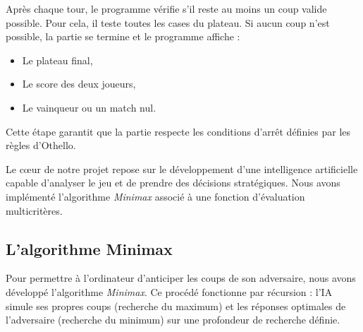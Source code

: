 \documentclass{article}
\begin{document}
Après chaque tour, le programme vérifie s'il reste au moins un coup valide possible. Pour cela, il teste toutes les cases du plateau. Si aucun coup n'est possible, la partie se termine et le programme affiche :

\begin{itemize}
    \item Le plateau final,
    \item Le score des deux joueurs,
    \item Le vainqueur ou un match nul.
\end{itemize}

Cette étape garantit que la partie respecte les conditions d'arrêt définies par les règles d'Othello.

Le cœur de notre projet repose sur le développement d'une intelligence artificielle capable d'analyser le jeu et de prendre des décisions stratégiques. Nous avons implémenté l'algorithme \emph{Minimax} associé à une fonction d'évaluation multicritères.

\subsection{L'algorithme Minimax}

Pour permettre à l'ordinateur d'anticiper les coups de son adversaire, nous avons développé l'algorithme \emph{Minimax}. Ce procédé fonctionne par récursion : l'IA simule ses propres coups (recherche du maximum) et les réponses optimales de l'adversaire (recherche du minimum) sur une profondeur de recherche définie.
\end{document}
